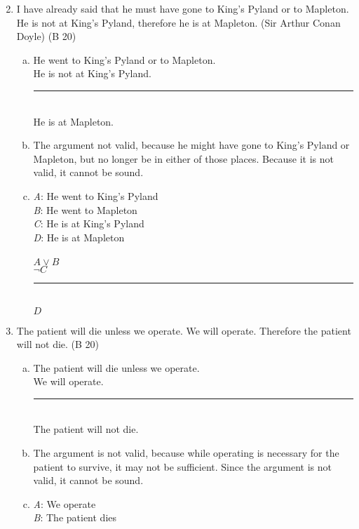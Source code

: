 \documentclass{article}
\begin{document}
\begin{enumerate}
    \setcounter{enumi}{1}
    \item I have already said that he must have gone to King's Pyland or to Mapleton. He is not at King's Pyland, therefore he is at Mapleton. (Sir Arthur Conan Doyle) (B 20)
          \begin{enumerate}[(a)]
              \item He went to King's Pyland or to Mapleton.\\
                    He is not at King's Pyland.\\
                    \rule{15em}{.5pt}\\
                    He is at Mapleton.
              \item The argument not valid, because he might have gone to King's Pyland or Mapleton, but no longer be in either of those places. Because it is not valid, it cannot be sound.
              \item \textit{A}: He went to King's Pyland\\
                    \textit{B}: He went to Mapleton\\
                    \textit{C}: He is at King's Pyland\\
                    \textit{D}: He is at Mapleton\\\\
                    $A \lor B$\\
                    $\neg C$\\
                    \rule{5em}{.5pt}\\
                    $D$
          \end{enumerate}
    \item The patient will die unless we operate. We will operate. Therefore the patient will not die. (B 20)
          \begin{enumerate}[(a)]
              \item The patient will die unless we operate.\\
                    We will operate.\\
                    \rule{15em}{.5pt}\\
                    The patient will not die.
              \item The argument is not valid, because while operating is necessary for the patient to survive, it may not be sufficient. Since the argument is not valid, it cannot be sound.
              \item \textit{A}: We operate\\
                    \textit{B}: The patient dies\\


\end{enumerate}
\end{enumerate}
\end{document}
